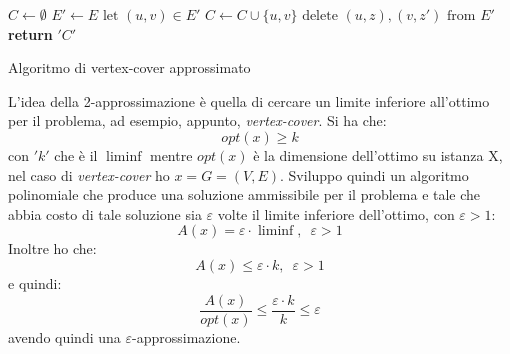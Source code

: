 										\begin{algorithm}
											\begin{algorithmic}
												\State $C\gets\emptyset$
												\State $E'\gets E$
												\State $\mbox{let }(u,v)\in E'$
												\State $C\gets C\cup \{u,v\}$
												\State $\mbox{delete } (u,z),(v,z') \mbox{ from } E'$
												\EndFor
												\EndWhile
												\State \textbf{return} $ 'C' $
												\EndFunction
											\end{algorithmic}
											\caption{Algoritmo di vertex-cover approssimato}
										\end{algorithm}
										\newpage
										L'idea della 2-approssimazione è quella di cercare un limite inferiore
										all'ottimo per il problema, ad esempio, appunto, \textit{vertex-cover}. Si ha
										che:
										\[opt(x)\geq k\]
										con $ 'k' $ che è il $\liminf$ mentre $opt(x)$ è la dimensione dell'ottimo su
										istanza X, nel caso di \textit{vertex-cover} ho $x=G=(V,E)$. Sviluppo quindi un
										algoritmo polinomiale che produce una soluzione ammissibile per il problema e
										tale che abbia costo di tale soluzione sia $\varepsilon$ volte il limite
										inferiore dell'ottimo, con $\varepsilon>1$:
										\[A(x)=\varepsilon\cdot \liminf,\,\,\,\varepsilon>1\]
										Inoltre ho che:
										\[A(x)\leq \varepsilon\cdot k,\,\,\,\varepsilon>1\]
										e quindi:
										\[\frac{A(x)}{opt(x)}\leq\frac{\varepsilon\cdot k}{k}\leq \varepsilon\]
										avendo quindi una $\varepsilon$-approssimazione.\\
